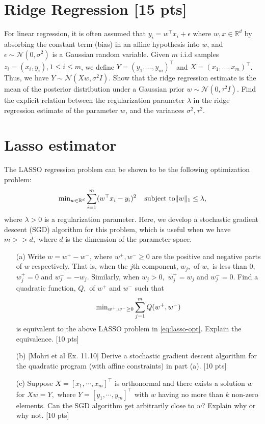 \documentclass[12pt]{article}
\begin{document}
\section{Ridge Regression [15 pts]}

For linear regression, it is often assumed that $y_i = w^\top x_i + \epsilon$ where $w, x \in \mathbb{R}^d$ by absorbing the constant term (bias) in an affine hypothesis into $w$, and $\epsilon \sim \mathcal{N} (0, \sigma^2)$ is a Gaussian random variable. Given $m$ i.i.d samples $z_i = (x_i, y_i), 1\leq i\leq m$, we define $Y = (y_1, ..., y_m)^\top$ and $X = (x_1, ..., x_m)^\top$. Thus, we have $Y \sim \mathcal{N} (Xw, \sigma^2 I)$. Show that the ridge regression estimate is the mean of the posterior distribution under a Gaussian prior $w \sim \mathcal{N} (0, \tau^2 I)$. Find the explicit relation between the regularization parameter $\lambda$ in the ridge regression estimate of the parameter $w$, and the variances $\sigma^2, \tau^2$.


\section{Lasso estimator}
The LASSO regression problem can be shown to be the following optimization problem:
\begin{equation}
	\label{eq:lasso-opt}
	{\rm min}_{w \in \mathbb{R}^d} \sum_{i=1}^m (w^\top x_i - y_i)^2 \;\;\;\; \text{subject to} \|w\|_1 \leq \lambda,
\end{equation}
where $\lambda > 0$ is a regularization parameter. Here, we develop a stochastic gradient descent (SGD) algorithm for this problem, which is useful when we have $m >> d,$ where $d$ is the dimension of the parameter space.
\begin{itemize}
	\item[(a)] Write $w = w^+ - w^-$, where $w^+, w^- \geq 0$ are the positive and negative parts of $w$ respectively. That is, when the $j$th component, $w_j,$ of $w,$ is less than 0, $w^+_j = 0$ and $w^-_j = -w_j.$ Similarly, when $w_j > 0,$ $w^+_j = w_j$ and $w^-_j = 0.$ Find a quadratic function, $Q,$ of $w^+$ and $w^-$ such that
	\begin{equation}
		{\rm min}_{w^+, w^- \geq 0} \sum_{j=1}^m Q(w^+, w^-)
	\end{equation}
	is equivalent to the above LASSO problem in \eqref{eq:lasso-opt}. Explain the equivalence. [10 pts]
\item[(b)] [Mohri et al Ex. 11.10] Derive a stochastic gradient descent algorithm for the quadratic program (with affine constraints) in part (a). [10 pts] 
\item[(c)] Suppose $X = [x_1, \cdots, x_m]^\top$ is orthonormal and there exists a solution $w$ for $Xw = Y,$ where $Y = [y_1,\cdots, y_m]^\top$ with $w$ having no more than $k$ non-zero elements. Can the SGD algorithm get arbitrarily close to $w$? Explain why or why not. [10 pts]    
\end{itemize}
\end{document}
